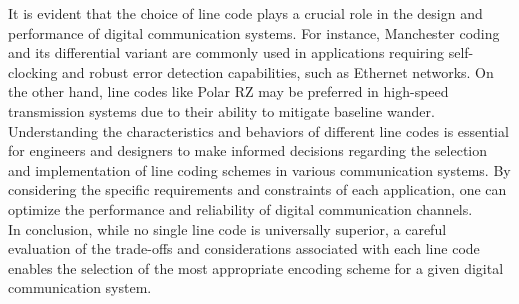 \documentclass[a4paper, 12pt, english]{article}
\begin{document}
It is evident that the choice of line code plays a crucial role in the design and performance of digital communication systems. For instance, Manchester coding and its differential variant are commonly used in applications requiring self-clocking and robust error detection capabilities, such as Ethernet networks. On the other hand, line codes like Polar RZ may be preferred in high-speed transmission systems due to their ability to mitigate baseline wander. \\

Understanding the characteristics and behaviors of different line codes is essential for engineers and designers to make informed decisions regarding the selection and implementation of line coding schemes in various communication systems. By considering the specific requirements and constraints of each application, one can optimize the performance and reliability of digital communication channels. \\

In conclusion, while no single line code is universally superior, a careful evaluation of the trade-offs and considerations associated with each line code enables the selection of the most appropriate encoding scheme for a given digital communication system. \\



\patchcmd{\thebibliography}{\section*}{\section}{}{}
\end{document}
